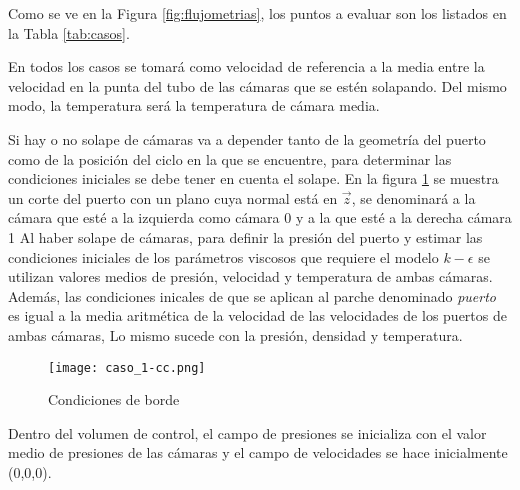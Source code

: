 Como se ve en la Figura \ref{fig:flujometrias}, los puntos a evaluar son los
listados en la Tabla \ref{tab:casos}.


En todos los casos se tomará como velocidad de referencia a la media entre la
velocidad en la punta del tubo de las cámaras que se estén solapando.
%
Del mismo modo, la temperatura será la temperatura de cámara media.

Si hay o no solape de cámaras va a depender tanto de la geometría del puerto
como de la posición del ciclo en la que se encuentre, para determinar las
condiciones iniciales se debe tener en cuenta el solape.
%
En la figura \ref{fig:geom} se muestra un corte del puerto con un plano cuya
normal está en $\vec{z}$, se denominará a la cámara que esté a la izquierda
como cámara 0 y a la que esté a la derecha cámara 1
%
Al haber solape de cámaras, para definir la presión del puerto y estimar las
condiciones iniciales de los parámetros viscosos que requiere el modelo
$k-\epsilon$ se utilizan valores medios de presión, velocidad y temperatura de
ambas cámaras.
%
Además, las condiciones inicales de que se aplican al parche denominado
\emph{puerto} es igual a la media aritmética de la velocidad de las velocidades
de los puertos de ambas cámaras, Lo mismo sucede con la presión, densidad y
temperatura.

\begin{figure}[h]
    \texttt{[image: caso\_1-cc.png]}
    \caption{Condiciones de borde}
    \label{fig:geom}
\end{figure}

Dentro del volumen de control, el campo de presiones se inicializa con el valor
medio de presiones de las cámaras y el campo de velocidades se hace
inicialmente (0,0,0).




